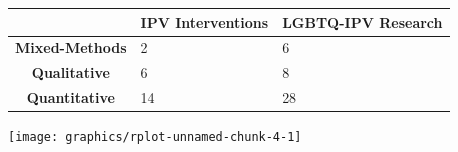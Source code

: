 \documentclass[]{tufte-handout}
\begin{document}
\begin{longtable}[]{@{}cll@{}}
\toprule
\begin{minipage}[b]{0.25\columnwidth}\centering\strut
~\strut
\end{minipage} & \begin{minipage}[b]{0.25\columnwidth}\raggedright\strut
IPV Interventions\strut
\end{minipage} & \begin{minipage}[b]{0.25\columnwidth}\raggedright\strut
LGBTQ-IPV Research\strut
\end{minipage}\tabularnewline
\midrule
\endhead
\begin{minipage}[t]{0.25\columnwidth}\centering\strut
\textbf{Mixed-Methods}\strut
\end{minipage} & \begin{minipage}[t]{0.25\columnwidth}\raggedright\strut
2\strut
\end{minipage} & \begin{minipage}[t]{0.25\columnwidth}\raggedright\strut
6\strut
\end{minipage}\tabularnewline
\begin{minipage}[t]{0.25\columnwidth}\centering\strut
\textbf{Qualitative}\strut
\end{minipage} & \begin{minipage}[t]{0.25\columnwidth}\raggedright\strut
6\strut
\end{minipage} & \begin{minipage}[t]{0.25\columnwidth}\raggedright\strut
8\strut
\end{minipage}\tabularnewline
\begin{minipage}[t]{0.25\columnwidth}\centering\strut
\textbf{Quantitative}\strut
\end{minipage} & \begin{minipage}[t]{0.25\columnwidth}\raggedright\strut
14\strut
\end{minipage} & \begin{minipage}[t]{0.25\columnwidth}\raggedright\strut
28\strut
\end{minipage}\tabularnewline
\bottomrule
\end{longtable}

\texttt{[image: graphics/rplot-unnamed-chunk-4-1]}

\newpage

\end{document}
